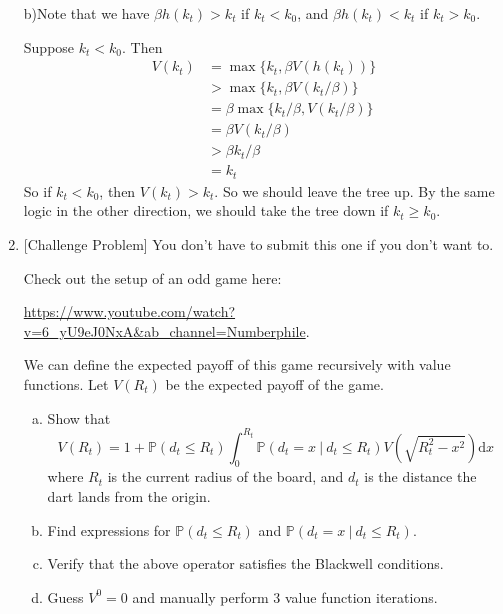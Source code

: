 \documentclass[12pt]{article}
\renewcommand{\P}{\mathbb{P}}
\begin{document}
\begin{enumerate}[1.]
b)Note that we have $\beta h(k_{t}) > k_{t}$ if $k_{t} < k_{0}$, and $\beta h(k_{t}) < k_{t}$ if $k_{t} > k_{0}$.\medskip

Suppose $k_{t} < k_{0}$. Then
\begin{align*}
V(k_{t}) &= \max\{k_{t}, \beta V(h(k_{t}))\}\\
& > \max\{k_{t}, \beta V(k_{t}/\beta)\}\\
& = \beta \max\{k_{t}/\beta, V(k_{t}/\beta)\}\\
& = \beta V(k_{t} / \beta)\\
& > \beta k_{t} / \beta\\
&= k_{t}
\end{align*}
So if $k_{t} < k_{0}$, then $V(k_{t}) > k_{t}$. So we should leave the tree up. By the same logic in the other direction, we should take the tree down if $k_{t} \geq k_{0}$.


\fi




\item {[Challenge Problem] You don't have to submit this one if you don't want to.}\smallskip

 Check out the setup of an odd game here: \smallskip

\href{https://www.youtube.com/watch?v=6_yU9eJ0NxA&ab_channel=Numberphile}{https://www.youtube.com/watch?v=6\_yU9eJ0NxA\&ab\_channel=Numberphile}.\bigskip

We can define the expected payoff of this game recursively with value functions. Let $V(R_{t})$ be the expected payoff of the game. 

\begin{enumerate}[a)]
\item Show that
\[V(R_{t}) = 1 + \P(d_{t} \leq R_{t})\int_{0}^{R_{t}} \P(d_{t}=x \ | \ d_{t} \leq R_{t}) V\left(\sqrt{R_{t}^{2} - x^{2}}  \right) \mathrm{d}x\]
where $R_{t}$ is the current radius of the board, and $d_{t}$ is the distance the dart lands from the origin.
\item Find expressions for $\P(d_{t} \leq R_{t})$ and $\P(d_{t}=x \ | \ d_{t} \leq R_{t})$.

\item Verify that the above operator satisfies the Blackwell conditions.

\item Guess $V^0 = 0$ and manually perform 3 value function iterations.


\end{enumerate}
\end{enumerate}
\end{document}
